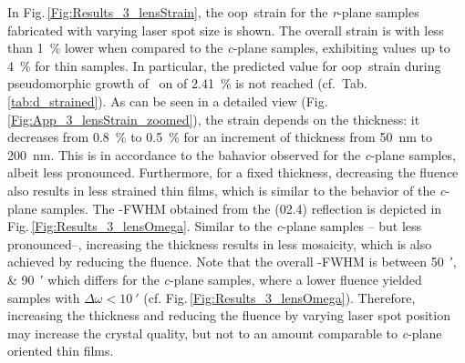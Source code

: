 In Fig.\,\ref{Fig:Results_3_lensStrain}, the \gls{oop}\ strain for the \textit{r}-plane samples fabricated with varying laser spot size is shown.
The overall strain is with less than \qty{1}{\percent} lower when compared to the \textit{c}-plane samples, exhibiting values up to \qty{4}{\percent} for thin samples.
In particular, the predicted value for \gls{oop}\ strain during pseudomorphic growth of \cro\ on  of \qty{2.41}{\percent} is not reached (cf.\ Tab.\,\ref{tab:d_strained}).
As can be seen in a detailed view (Fig.\,\ref{Fig:App_3_lensStrain_zoomed}), the strain depends on the thickness:
it decreases from \qty{0.8}{\percent} to \qty{0.5}{\percent} for an increment of thickness from \qty{50}{\nm} to \qty{200}{\nm}.
This is in accordance to the bahavior observed for the \textit{c}-plane samples, albeit less pronounced.
Furthermore, for a fixed thickness, decreasing the fluence also results in less strained thin films, which is similar to the behavior of the \textit{c}-plane samples.
The \textomega-FWHM obtained from the (02.4) reflection is depicted in Fig.\,\ref{Fig:Results_3_lensOmega}.
Similar to the \textit{c}-plane samples -- but less pronounced--, increasing the thickness results in less mosaicity, which is also achieved by reducing the fluence.
Note that the overall \textomega-FWHM is between \qtylist{50;90}{\arcminute} which differs for the \textit{c}-plane samples, where a lower fluence yielded samples with $\Delta\omega<\qty{10}{\arcminute}$ (cf. Fig.\,\ref{Fig:Results_3_lensOmega}).
Therefore, increasing the thickness and reducing the fluence by varying laser spot position may increase the crystal quality, but not to an amount comparable to \textit{c}-plane oriented thin films.
